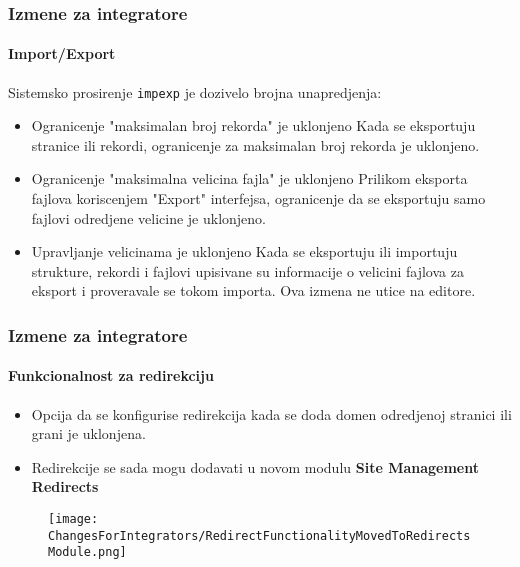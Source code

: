 \begin{frame}[fragile]
	\frametitle{Izmene za integratore}
	\framesubtitle{Import/Export}

	Sistemsko prosirenje \texttt{impexp} je dozivelo brojna unapredjenja:

	\begin{itemize}
		\item Ogranicenje "maksimalan broj rekorda" je uklonjeno\newline
			\smaller
				Kada se eksportuju stranice ili rekordi, 
				ogranicenje za maksimalan broj rekorda je uklonjeno.
			\normalsize

		\item Ogranicenje "maksimalna velicina fajla" je uklonjeno\newline
			\smaller
				Prilikom eksporta fajlova koriscenjem "Export" interfejsa,
				ogranicenje da se eksportuju samo fajlovi odredjene velicine je uklonjeno.
			\normalsize

		\item Upravljanje velicinama je uklonjeno\newline
			\smaller
				Kada se eksportuju ili importuju strukture, rekordi i fajlovi
				upisivane su informacije o velicini fajlova za eksport i proveravale se tokom importa.
				Ova izmena ne utice na editore.
			\normalsize

	\end{itemize}

\end{frame}


\begin{frame}[fragile]
	\frametitle{Izmene za integratore}
	\framesubtitle{Funkcionalnost za redirekciju}

	\begin{itemize}
		\item Opcija da se konfigurise redirekcija kada se doda domen odredjenoj stranici ili grani je uklonjena.
		\item Redirekcije se sada mogu dodavati u novom modulu\newline
			\textbf{Site Management} \textrightarrow \textbf{Redirects}
	\end{itemize}

	\begin{figure}
		\texttt{[image: ChangesForIntegrators/RedirectFunctionalityMovedToRedirectsModule.png]}
	\end{figure}

\end{frame}

